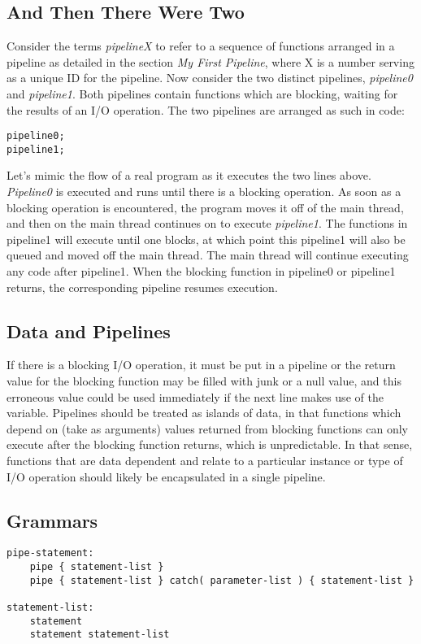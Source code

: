 \documentclass[./LRM_main.tex]{subfiles}
\begin{document}
\subsection{And Then There Were Two}
Consider the terms \textit{pipelineX} to refer to a sequence of functions arranged in a pipeline as detailed in the section \textit{My First Pipeline}, where X is a number serving as a unique ID for
the pipeline. Now consider the two distinct pipelines, \textit{pipeline0} and \textit{pipeline1}. Both pipelines contain functions which are blocking, waiting for the results of an I/O operation. The two pipelines are arranged as such in code:
\begin{lstlisting}
pipeline0;
pipeline1;
\end{lstlisting}
Let's mimic the flow of a real program as it executes the two lines above. \textit{Pipeline0} is executed and runs until there is a blocking operation. As soon as a blocking operation is encountered,
the program moves it off of the main thread, and then on the main thread continues on to execute \textit{pipeline1}. The functions in pipeline1 will execute until one blocks, at which point this pipeline1 will also be queued and moved off the main thread. The main thread will continue executing any code after pipeline1. When the blocking function in pipeline0 or pipeline1 returns, the corresponding pipeline resumes execution.   


\subsection{Data and Pipelines}
If there is a blocking I/O operation, it must be put in a pipeline or the return value for the blocking function may be filled with junk or a null value, and this erroneous value could be used immediately if the next line makes use of the variable. Pipelines should be treated as islands of data, in that functions which depend on (take as arguments) values returned from blocking functions can only execute after the blocking function returns, which is unpredictable. In that sense, functions that are data dependent and relate to a particular instance or type of I/O operation should likely be encapsulated in a single pipeline. 

\subsection{Grammars}
\begin{lstlisting}
pipe-statement:
	pipe { statement-list }
	pipe { statement-list } catch( parameter-list ) { statement-list }

statement-list:
    statement
    statement statement-list
\end{lstlisting}
\end{document}
